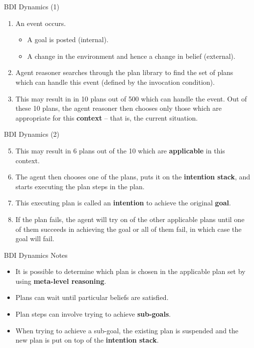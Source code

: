 \documentclass[aspectratio=1610,xcolor=dvipsnames,t]{beamer}
\begin{document}
\begin{frame}{BDI Dynamics (1)}
    \begin{enumerate}
        \item An event occurs.
            \begin{itemize} 
                \item A goal is posted (internal).
                \item A change in the environment and hence a change in 
                      belief (external). 
            \end{itemize} 
        \item Agent reasoner searches through the plan library to
              find the set of plans which can handle this event
              (defined by the invocation condition).
        \item This may result in in 10 plans out of 500 which can
              handle the event. Out of these 10 plans, the agent
              reasoner then chooses only those which are 
              appropriate for this \textbf{context} -- that is, 
              the current situation. 
    \end{enumerate} 
\end{frame} 

\begin{frame}{BDI Dynamics (2)}
    \begin{enumerate}
        \setcounter{enumi}{4}
        \item This may result in 6 plans out of the 10 which are
              \textbf{applicable} in this context. 
        \item The agent then chooses one of the plans, puts it on the
              \textbf{intention stack}, and starts executing the plan
              steps in the plan.
        \item This executing plan is called an \textbf{intention} to 
              achieve the original \textbf{goal}. 
        \item If the plan fails, the agent will try on of the other
              applicable plans until one of them succeeds in 
              achieving the goal or all of them fail, in which case
              the goal will fail.
    \end{enumerate} 
\end{frame} 

\begin{frame}{BDI Dynamics Notes}
    \begin{itemize} 
        \item It is possible to determine which plan is chosen in the
              applicable plan set by using \textbf{meta-level reasoning}.
        \item Plans can wait until particular beliefs are satisfied.
        \item Plan steps can involve trying to achieve \textbf{sub-goals}.
        \item When trying to achieve a sub-goal, the existing plan
              is suspended and the new plan is put on top of the
              \textbf{intention stack}. 
    \end{itemize} 
\end{frame} 
\end{document}
